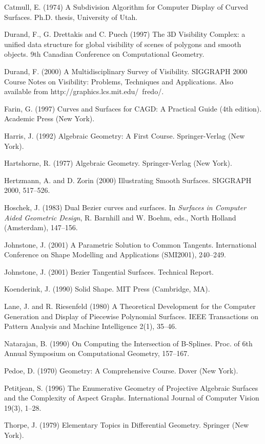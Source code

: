 \documentclass[12pt]{article}
\newif\ifJournal
\begin{document}

\begin{thebibliography}{99}

Catmull, E. (1974)
A Subdivision Algorithm for Computer Display of Curved Surfaces.
Ph.D. thesis, University of Utah.

Durand, F., G. Drettakis and C. Puech (1997)
The 3D Visibility Complex: a unified data structure for global
visibility of scenes of polygons and smooth objects.
9th Canadian Conference on Computational Geometry.

Durand, F. (2000)
A Multidisciplinary Survey of Visibility.
SIGGRAPH 2000 Course Notes on Visibility: Problems, Techniques
and Applications.
Also available from http://graphics.lcs.mit.edu/~fredo/.

Farin, G. (1997)
Curves and Surfaces for CAGD: A Practical Guide (4th edition).
Academic Press (New York).

Harris, J. (1992)
Algebraic Geometry: A First Course.
Springer-Verlag (New York).

Hartshorne, R. (1977)
Algebraic Geometry.
Springer-Verlag (New York).

Hertzmann, A. and D. Zorin (2000)
Illustrating Smooth Surfaces.
SIGGRAPH 2000, 517--526.

Hoschek, J. (1983)
Dual Bezier curves and surfaces.
In {\em Surfaces in Computer Aided Geometric Design},
R. Barnhill and W. Boehm, eds.,
North Holland (Amsterdam), 147--156.

Johnstone, J. (2001)
A Parametric Solution to Common Tangents.
International Conference on Shape Modelling and Applications (SMI2001),
240--249.

\ifJournal
\bibitem{jj01c}
Johnstone, J. (2001)
Smooth Visibility from a Point.
39th Annual ACM Southeast Conference, 296--302.
\fi

Johnstone, J. (2001)
Bezier Tangential Surfaces.
Technical Report.

Koenderink, J. (1990)
Solid Shape.
MIT Press (Cambridge, MA).

Lane, J. and R. Riesenfeld (1980)
A Theoretical Development for the Computer Generation and Display
of Piecewise Polynomial Surfaces.
IEEE Transactions on Pattern Analysis and Machine Intelligence 2(1),
35--46.

Natarajan, B. (1990)
On Computing the Intersection of B-Splines.
Proc. of 6th Annual Symposium on Computational Geometry,
157--167.

Pedoe, D. (1970)
Geometry: A Comprehensive Course.
Dover (New York).

Petitjean, S. (1996)
The Enumerative Geometry of Projective Algebraic Surfaces and
the Complexity of Aspect Graphs.
International Journal of Computer Vision 19(3), 1--28.

Thorpe, J. (1979)
Elementary Topics in Differential Geometry.
Springer (New York).

\end{thebibliography}
\end{document}
